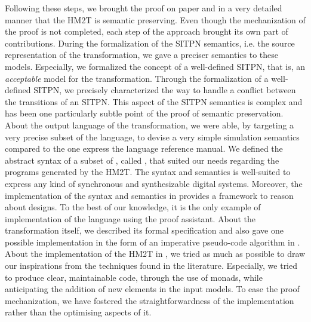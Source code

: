 \documentclass[pdflatex,sn-mathphys]{sn-jnl}%
\theoremstyle{thmstyleone}%
\theoremstyle{thmstyletwo}%
\theoremstyle{thmstylethree}%
\begin{document}
\bigskip


Following these steps, we brought the proof on paper and in a very
detailed manner that the HM2T is semantic preserving. Even though the
mechanization of the proof is not completed, each step of the approach
brought its own part of contributions.  During the formalization of
the SITPN semantics, i.e. the source representation of the
transformation, we gave a preciser semantics to these
models. Especially, we formalized the concept of a well-defined SITPN,
that is, an \textit{acceptable} model for the
transformation. %
Through the formalization of a well-defined SITPN, we precisely
characterized the way to handle a conflict between the transitions of
an SITPN. This aspect of the SITPN semantics is complex and has been
one particularly subtle point of the proof of semantic preservation.
About the output language of the transformation, we were able, by
targeting a very precise subset of the \vhdl{} language, to devise a
very simple simulation semantics compared to the one express the
language reference manual. We defined the abstract syntax of a subset
of \vhdl{}, called \hvhdl{}, that suited our needs regarding the
\vhdl{} programs generated by the HM2T. The \hvhdl{} syntax and
semantics is well-suited to express any kind of synchronous and
synthesizable digital systems. Moreover, the implementation of the
\hvhdl{} syntax and semantics in \coq{} provides a framework to reason
about \hvhdl{} designs. To the best of our knowledge, it is the only
example of implementation of the \vhdl{} language using the \coq{}
proof assistant. About the transformation itself, we described its
formal specification and also gave one possible implementation in the
form of an imperative pseudo-code algorithm in
\cite{Iampietro2021}. About the implementation of the HM2T in \coq{},
we tried as much as possible to draw our inspirations from the
techniques found in the literature. Especially, we tried to produce
clear, maintainable code, through the use of monads, while
anticipating the addition of new elements in the input models.  To
ease the proof mechanization, we have fostered the straightforwardness
of the implementation rather than the optimising aspects of it.
\end{document}
